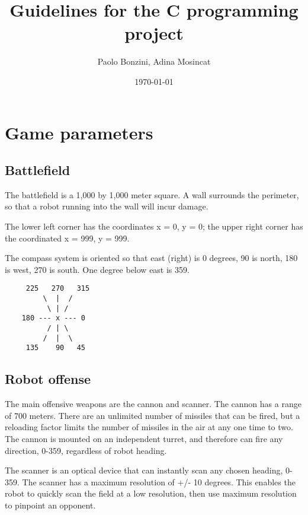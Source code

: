 \documentclass{article}
\title{Guidelines for the C programming project}
\author{Paolo Bonzini, Adina Mosincat}
\date{\today}
\begin{document}
\maketitle

\section{Game parameters}

\subsection{Battlefield}

        The battlefield is a 1,000 by 1,000 meter square.  A wall
        surrounds the perimeter, so that a robot running into the wall
        will incur damage.

        The lower left corner has the coordinates x = 0, y = 0; the upper
        right corner has the coordinated x = 999, y = 999.

        The compass system is oriented so that east (right) is 0
        degrees, 90 is north, 180 is west, 270 is south.  One degree
        below east is 359.


\begin{verbatim}
     225   270   315
         \  |  / 
          \ | /
    180 --- x --- 0
          / | \
         /  |  \ 
     135    90   45
\end{verbatim}



\subsection{Robot offense}

        The main offensive weapons are the cannon and scanner.  The
        cannon has a range of 700 meters.  There are an unlimited number
        of missiles that can be fired, but a reloading factor limits the
        number of missiles in the air at any one time to two.  The cannon
        is mounted on an independent turret, and therefore can fire any
        direction, 0-359, regardless of robot heading.

        The scanner is an optical device that can instantly scan any
        chosen heading, 0-359.  The scanner has a maximum resolution of  
        +/- 10 degrees.  This enables the robot to quickly scan the field
        at a low resolution, then use maximum resolution to pinpoint an
        opponent.
\end{document}
